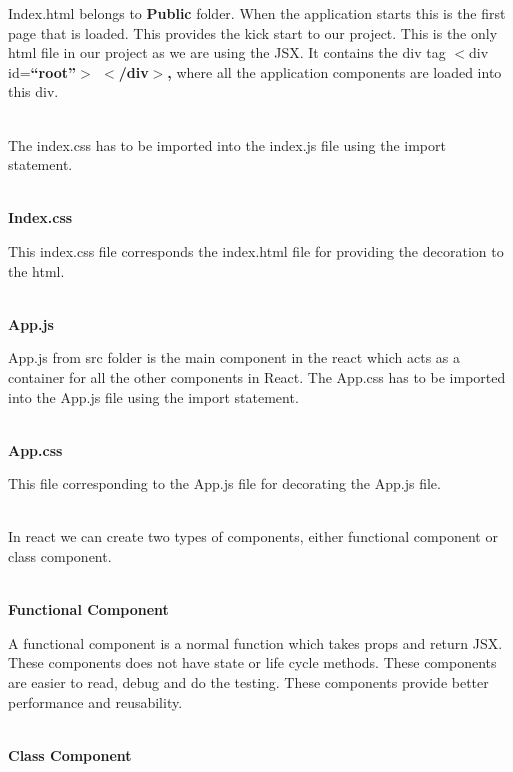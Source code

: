 \documentclass{article}
\begin{document}
\noindent
 Index.html belongs to \textbf{Public} folder. When the application starts this is the first page that is loaded. This provides the kick start to our project. This is the only html file in our project as we are using the JSX. It contains the div tag $\mathrm{<}$div id=\textbf{``root''$\boldsymbol{\mathrm{>}}$ $\boldsymbol{\mathrm{<}}$/div$\boldsymbol{\mathrm{>}}$, }where all the application components are loaded into this div.

\noindent 

\noindent\\
 The index.css has to be imported into the index.js file using the import statement.

\noindent 

\noindent\\
 \textbf{Index.css}

\noindent
 This index.css file corresponds the index.html file for providing the decoration to the html.

\noindent \textbf{}

\noindent\\
 \textbf{App.js}

\noindent
 App.js from src folder is the main component in the react which acts as a container for all the other components in React. The App.css has to be imported into the App.js file using the import statement.

\noindent 

\noindent\\
 \textbf{App.css}

\noindent
 This file corresponding to the App.js file for decorating the App.js file.
\newpage
\noindent

\noindent \textbf{}\underbar{}

\noindent\\
 In react we can create two types of components, either functional component or class component.

\noindent 

\noindent\\
 \textbf{Functional Component}

\noindent
 A functional component is a normal function which takes props and return JSX. These components does not have state or life cycle methods. These components are easier to read, debug and do the testing. These components provide better performance and reusability. 

\noindent 

\noindent\\
 \textbf{Class Component}
\end{document}
